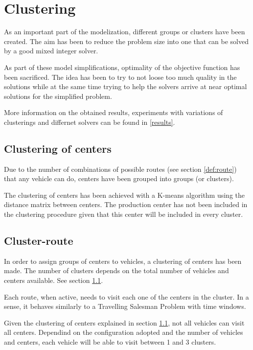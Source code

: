 \section{Clustering}

As an important part of the modelization, different groups or clusters have been created. The aim has been to reduce the problem size into one that can be solved by a good mixed integer solver.

As part of these model simplifications, optimality of the objective function has been sacrificed. The idea has been to try to not loose too much quality in the solutions while at the same time trying to help the solvers arrive at near optimal solutions for the simplified problem.


More information on the obtained results, experiments with variations of clusterings and differnet solvers can be found in \ref{results}.


\subsection{Clustering of centers}
\label{def:cluster}

Due to the number of combinations of possible routes (see section \ref{def:route}) that any vehicle can do, centers have been grouped into groups (or clusters).

The clustering of centers has been achieved with a K-means algorithm using the distance matrix between centers. The production center has not been included in the clustering procedure given that this center will be included in every cluster.

\subsection{Cluster-route}

In order to assign groups of centers to vehicles, a clustering of centers has been made. The number of clusters depends on the total number of vehicles and centers available. See section \ref{def:cluster}.

Each route, when active, needs to visit each one of the centers in the cluster. In a sense, it behaves similarly to a Travelling Salesman Problem with time windows.

Given the clustering of centers explained in section \ref{def:cluster}, not all vehicles can visit all centers. Dependind on the configuration adopted and the number of vehicles and centers, each vehicle will be able to visit between 1 and 3 clusters. 

